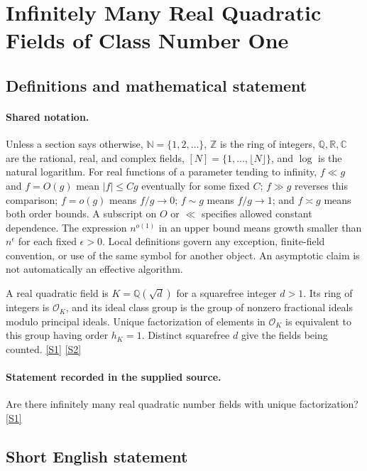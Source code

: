 \documentclass[11pt,a4paper]{article}
\newcommand{\N}{\mathbb{N}}
\newcommand{\Z}{\mathbb{Z}}
\newcommand{\Q}{\mathbb{Q}}
\newcommand{\R}{\mathbb{R}}
\newcommand{\C}{\mathbb{C}}
\newcommand{\sref}[2]{\hyperlink{source:#1:#2}{[S#2]}}
\begin{document}
\section{Infinitely Many Real Quadratic Fields of Class Number One}\label{statement}


\subsection{Definitions and mathematical statement}

\paragraph{Shared notation.}Unless a section says otherwise, $\N=\{1,2,\ldots\}$,
$\Z$ is the ring of integers, $\Q,\R,\C$ are the rational, real, and complex
fields, $[N]=\{1,\ldots,\lfloor N\rfloor\}$, and $\log$ is the natural
logarithm. For real functions of a parameter tending to infinity,
$f\ll g$ and $f=O(g)$ mean $|f|\leq Cg$ eventually for some fixed $C$;
$f\gg g$ reverses this comparison; $f=o(g)$ means $f/g\to0$;
$f\sim g$ means $f/g\to1$; and $f\asymp g$ means both order bounds.
A subscript on $O$ or $\ll$ specifies allowed constant dependence.
The expression $n^{o(1)}$ in an upper bound means growth smaller than
$n^\epsilon$ for each fixed $\epsilon>0$. Local definitions govern any
exception, finite-field convention, or use of the same symbol for another
object. An asymptotic claim is not automatically an effective algorithm.



A real quadratic field is $K=\Q(\sqrt d)$ for a squarefree integer $d>1$. Its ring of integers is $\mathcal O_K$, and its ideal class group is the group of nonzero fractional ideals modulo principal ideals. Unique factorization of elements in $\mathcal O_K$ is equivalent to this group having order $h_K=1$. Distinct squarefree $d$ give the fields being counted. \sref{statement}{1} \sref{statement}{2}

\paragraph{Statement recorded in the supplied source.}
Are there infinitely many real quadratic number fields with unique factorization? \sref{statement}{1}

\subsection{Short English statement}
\end{document}

